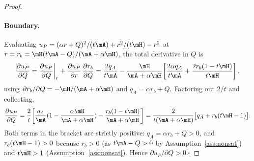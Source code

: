 \begin{proof}
\paragraph{Boundary.} Evaluating
$u_P=(\alpha r+Q)^2/(t\mA)+r^2/(t\mH)-r^2$ at $r=r_b=\mH (t\mA-Q)/(\mA+\alpha\mH)$, the total
derivative in $Q$ is
\[
\frac{\partial u_P}{\partial Q}
=\frac{\partial u_P}{\partial Q}\bigg|_{r}
+\frac{\partial u_P}{\partial r}\,\frac{\partial r_b}{\partial Q}
=\frac{2q_A}{t\mA}
-\frac{\mH}{\mA+\alpha\mH}\!\left[\frac{2\alpha q_A}{t\mA}+\frac{2r_b(1-t\mH)}{t\mH}\right],
\]
using $\partial r_b/\partial Q=-\mH/(\mA+\alpha\mH)$ and $q_A=\alpha r_b+Q$. Factoring
out $2/t$ and collecting,
\[
\frac{\partial u_P}{\partial Q}
=\frac{2}{t}\!\left[\frac{q_A}{\mA}(1-\frac{\alpha\mH}{\mA+\alpha\mH})
-\frac{r_b(1-t\mH)}{\mA+\alpha\mH}\right]
=\frac{2}{t(\mA+\alpha\mH)}\bigl[q_A+r_b(t\mH-1)\bigr].
\]
Both terms in the bracket
are strictly positive: $q_A=\alpha r_b+Q>0$, and $r_b(t\mH-1)>0$ because
$r_b>0$ (as $t\mA-Q>0$ by Assumption~\ref{ass:nonsat}) and
$t\mH>1$ (Assumption~\ref{ass:nonsat}). Hence
$\partial u_P/\partial Q>0$.\hfill $\square$
\end{proof}





